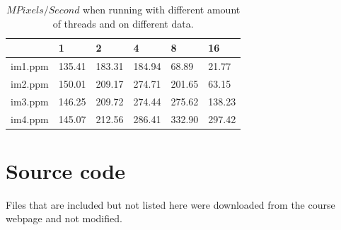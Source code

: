 \documentclass[a4paper,11pt]{article}
\begin{document}
\begin{table}[h!]
  \caption{$MPixels/Second$ when running with different amount of threads and on different data.}
  \label{mpixelspersecond}
  \begin{tabular}[h]{|l|l|l|l|l|l|}
    \hline
                      & 1      & 2      & 4      & 8      & 16\\
    \hline
    im1.ppm           & 135.41 & 183.31 & 184.94 & 68.89  & 21.77\\ 
    im2.ppm           & 150.01 & 209.17 & 274.71 & 201.65 & 63.15\\ 
    im3.ppm           & 146.25 & 209.72 & 274.44 & 275.62 & 138.23\\ 
    im4.ppm           & 145.07 & 212.56 & 286.41 & 332.90 & 297.42\\
    \hline
  \end{tabular}
\end{table}

\clearpage
\section{Source code}
Files that are included but not listed here were downloaded from the course webpage and not modified.


\clearpage


\clearpage

\end{document}
